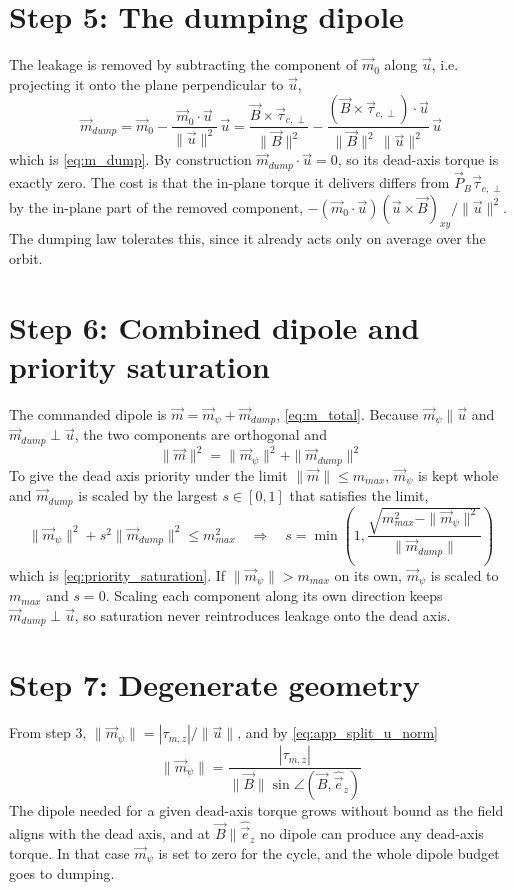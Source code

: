 \section*{Step 5: The dumping dipole}
The leakage is removed by subtracting the component of $\vec{m}_0$ along $\vec{u}$, i.e. projecting it onto the plane perpendicular to $\vec{u}$,
\begin{equation*}
    \vec{m}_{dump} = \vec{m}_0 - \frac{\vec{m}_0\cdot\vec{u}}{\|\vec{u}\|^2}\,\vec{u} = \frac{\vec{B}\times\vec{\tau}_{c,\perp}}{\|\vec{B}\|^2} - \frac{(\vec{B}\times\vec{\tau}_{c,\perp})\cdot\vec{u}}{\|\vec{B}\|^2\,\|\vec{u}\|^2}\,\vec{u}
\end{equation*}
which is \autoref{eq:m_dump}. By construction $\vec{m}_{dump}\cdot\vec{u} = 0$, so its dead-axis torque is exactly zero. The cost is that the in-plane torque it delivers differs from $\vec{P}_B\vec{\tau}_{c,\perp}$ by the in-plane part of the removed component, $-(\vec{m}_0\cdot\vec{u})(\vec{u}\times\vec{B})_{xy}/\|\vec{u}\|^2$. The dumping law tolerates this, since it already acts only on average over the orbit.

\section*{Step 6: Combined dipole and priority saturation}
The commanded dipole is $\vec{m} = \vec{m}_\psi + \vec{m}_{dump}$, \autoref{eq:m_total}. Because $\vec{m}_\psi \parallel \vec{u}$ and $\vec{m}_{dump}\perp\vec{u}$, the two components are orthogonal and
\begin{equation*}
    \|\vec{m}\|^2 = \|\vec{m}_\psi\|^2 + \|\vec{m}_{dump}\|^2
\end{equation*}
To give the dead axis priority under the limit $\|\vec{m}\| \leq m_{max}$, $\vec{m}_\psi$ is kept whole and $\vec{m}_{dump}$ is scaled by the largest $s\in[0,1]$ that satisfies the limit,
\begin{equation*}
    \|\vec{m}_\psi\|^2 + s^2\|\vec{m}_{dump}\|^2 \leq m_{max}^2 \quad\Longrightarrow\quad s = \min\!\left(1, \frac{\sqrt{m_{max}^2 - \|\vec{m}_\psi\|^2}}{\|\vec{m}_{dump}\|}\right)
\end{equation*}
which is \autoref{eq:priority_saturation}. If $\|\vec{m}_\psi\| > m_{max}$ on its own, $\vec{m}_\psi$ is scaled to $m_{max}$ and $s = 0$. Scaling each component along its own direction keeps $\vec{m}_{dump}\perp\vec{u}$, so saturation never reintroduces leakage onto the dead axis.

\section*{Step 7: Degenerate geometry}
From step 3, $\|\vec{m}_\psi\| = |\tau_{m,z}|/\|\vec{u}\|$, and by \autoref{eq:app_split_u_norm}
\begin{equation*}
    \|\vec{m}_\psi\| = \frac{|\tau_{m,z}|}{\|\vec{B}\|\sin\angle(\vec{B},\hat{\vec{e}}_z)}
\end{equation*}
The dipole needed for a given dead-axis torque grows without bound as the field aligns with the dead axis, and at $\vec{B}\parallel\hat{\vec{e}}_z$ no dipole can produce any dead-axis torque. In that case $\vec{m}_\psi$ is set to zero for the cycle, and the whole dipole budget goes to dumping.


